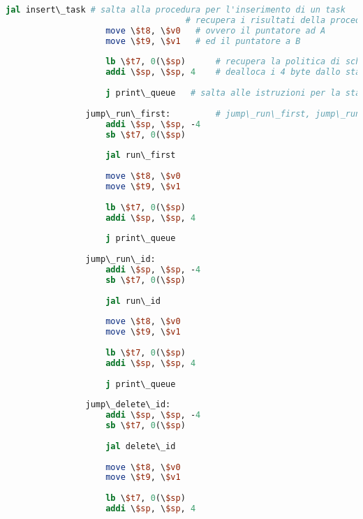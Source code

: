 \begin{center}
\begin{lstlisting}[language=mips, gobble=14, stepnumber=1]
                    jal insert\_task # salta alla procedura per l'inserimento di un task
                                    # recupera i risultati della procedura
                    move \$t8, \$v0   # ovvero il puntatore ad A
                    move \$t9, \$v1   # ed il puntatore a B
                    
                    lb \$t7, 0(\$sp)      # recupera la politica di scheduling dallo stack
                    addi \$sp, \$sp, 4    # dealloca i 4 byte dallo stack
                    
                    j print\_queue   # salta alle istruzioni per la stampa della coda
                    
                jump\_run\_first:         # jump\_run\_first, jump\_run\_id, jump\_delete\_id e jump\_change\_prio analoghi a jump\_insert\_task
                    addi \$sp, \$sp, -4
                    sb \$t7, 0(\$sp)
                    
                    jal run\_first
                    
                    move \$t8, \$v0
                    move \$t9, \$v1
                    
                    lb \$t7, 0(\$sp)
                    addi \$sp, \$sp, 4
                    
                    j print\_queue
                    
                jump\_run\_id:
                    addi \$sp, \$sp, -4
                    sb \$t7, 0(\$sp)
                    
                    jal run\_id
                    
                    move \$t8, \$v0
                    move \$t9, \$v1
                    
                    lb \$t7, 0(\$sp)
                    addi \$sp, \$sp, 4
                    
                    j print\_queue
                    
                jump\_delete\_id:
                    addi \$sp, \$sp, -4
                    sb \$t7, 0(\$sp)
                    
                    jal delete\_id
                    
                    move \$t8, \$v0
                    move \$t9, \$v1
                    
                    lb \$t7, 0(\$sp)
                    addi \$sp, \$sp, 4
                    

\end{lstlisting}
\end{center}
